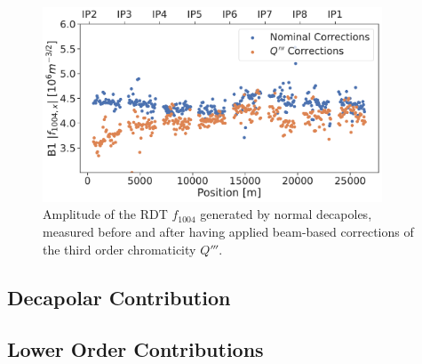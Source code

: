 \begin{figure}[H]
    \centering
    \includegraphics[width=0.9\textwidth]{./images/f1004_dq3.pdf}
    \caption{Amplitude of the RDT $f_{1004}$ generated by normal decapoles, measured before and
    after having applied beam-based corrections of the third order chromaticity $Q'''$.}
    \label{fig:decapoles:rdts:f1004_dq3}
\end{figure}



\subsection{Decapolar Contribution}

\subsection{Lower Order Contributions}